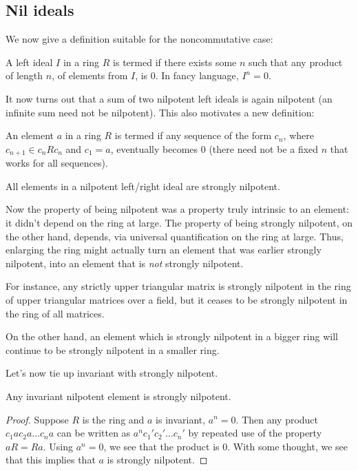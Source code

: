 \documentclass[a4paper]{amsart}
\begin{document}
\subsection{Nil ideals}

We now give a definition suitable for the noncommutative case:

\begin{definer}
  A left ideal $I$ in a ring $R$ is termed
   if there exists some $n$ such
  that any product of length $n$, of elements from $I$, is $0$. In
  fancy language, $I^n = 0$.
\end{definer}

It now turns out that a sum of two nilpotent left ideals is again
nilpotent (an infinite sum need not be nilpotent). This also motivates
a new definition:

\begin{definer}
  An element $a$ in a ring $R$ is termed
   if any sequence of
  the form $c_n$, where $c_{n+1} \in c_nRc_n$ and $c_1 = a$,
  eventually becomes $0$ (there need not be a fixed $n$ that works for
  all sequences).

  All elements in a nilpotent left/right ideal are strongly nilpotent.
\end{definer}

Now the property of being nilpotent was a property truly intrinsic to
an element: it didn't depend on the ring at large. The property of
being strongly nilpotent, on the other hand, depends, via universal
quantification on the ring at large. Thus, enlarging the ring might
actually turn an element that was earlier strongly nilpotent, into an
element that is {\em not} strongly nilpotent.

For instance, any strictly upper triangular matrix is strongly
nilpotent in the ring of upper triangular matrices over a field, but
it ceases to be strongly nilpotent in the ring of all matrices.

On the other hand, an element which is strongly nilpotent in a bigger
ring will continue to be strongly nilpotent in a smaller ring.

Let's now tie up invariant with strongly nilpotent.

\begin{claimer}
  Any invariant nilpotent element is strongly nilpotent.
\end{claimer}

\begin{proof}
  Suppose $R$ is the ring and $a$ is invariant, $a^n = 0$. Then any
  product $c_1ac_2a \ldots c_na$ can be written as $a^nc_1'c_2'\ldots
  c_n'$ by repeated use of the property $aR = Ra$. Using $a^n = 0$, we
  see that the product is $0$. With some thought, we see that this
  implies that $a$ is strongly nilpotent.
\end{proof}
\end{document}
